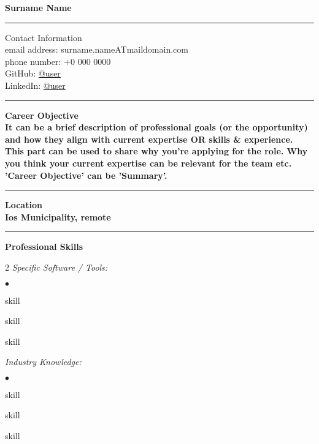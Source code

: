 \documentclass[oneside,final,10pt]{extreport}
\newenvironment{compactlist}{
	\begin{list}{{$\bullet$}}{
		\setlength\leftmargin{0.4cm}
		\setlength\partopsep{0pt}
		\setlength\parskip{0pt}
		\setlength\parsep{0pt}
		\setlength\topsep{0pt}
		\setlength\itemsep{0pt}
	}
}{
	\end{list}
}
\begin{document}
\bfseries
Surname Name \\
\rule{\textwidth}{0.4pt}
Contact Information \\
\noindent
\mdseries
email address: 
surname.nameATmaildomain.com \\
phone number: 
+0 000 0000 \\
GitHub:
\href{https://github.com/user}{@user} \\
LinkedIn:
\href{https://www.linkedin.com/in/username}{@user} \\
\rule{\textwidth}{0.4pt}

\bfseries
Career Objective \\
\mdseries
It can be a brief description of professional goals (or the opportunity) and how they align with current expertise OR skills \& experience. \\
This part can be used to share why you're applying for the role. Why you think your current expertise can be relevant for the team etc. \\
'Career Objective' can be 'Summary'. \\[5pt]
\rule{\textwidth}{0.4pt}

\bfseries
Location \\
\mdseries
Ios Municipality, remote \\
\rule{\textwidth}{0.4pt}

\bfseries
Professional Skills
\mdseries
	\begin{multicols}{2}
		\textsl{Specific Software / Tools:}
			\begin{compactlist}
				\item skill
				\item skill
				\item skill
			\end{compactlist}
		\textsl{Industry Knowledge:}
			\begin{compactlist}
				\item skill
				\item skill
				\item skill
			\end{compactlist}
	\end{multicols}
\end{document}
